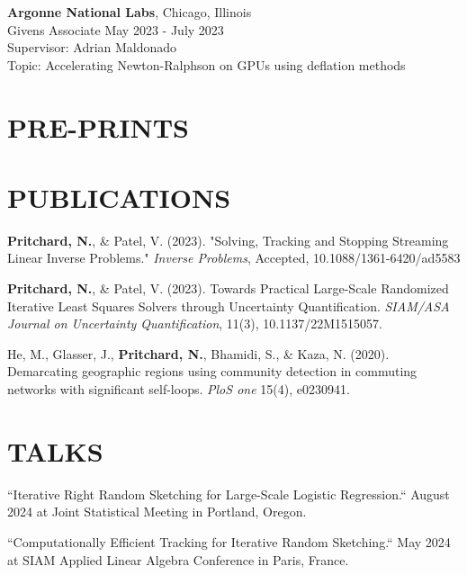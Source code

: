 \documentclass[margin,11pt]{res}
\def\nwp{\textbf{Pritchard, N.}}
\begin{document}
\begin{resume}
                {\bf Argonne National Labs}, \hfill Chicago, Illinois\\
                Givens Associate \hfill May 2023 - July 2023\\
                Supervisor: Adrian Maldonado\\
                Topic: Accelerating Newton-Ralphson on GPUs using deflation methods
\section{PRE-PRINTS}
\section{PUBLICATIONS}
\nwp, \& Patel, V. (2023). "Solving, Tracking and Stopping Streaming Linear Inverse Problems." \textit{Inverse Problems}, Accepted, 10.1088/1361-6420/ad5583


\nwp, \& Patel, V. (2023). Towards Practical Large-Scale Randomized Iterative Least Squares Solvers through Uncertainty Quantification. \textit{SIAM/ASA Journal on Uncertainty Quantification}, 11(3), 10.1137/22M1515057. 

He, M., Glasser, J., \nwp, Bhamidi, S., \& Kaza, N. (2020). Demarcating geographic regions using community detection in commuting networks with significant self-loops. \textit{PloS one} 15(4), e0230941.



\section{TALKS}

``Iterative Right Random Sketching for Large-Scale Logistic Regression.`` August 2024 at Joint Statistical Meeting in Portland, Oregon.

``Computationally Efficient Tracking for Iterative Random Sketching.`` May 2024 at SIAM Applied Linear Algebra Conference in Paris, France.


\end{resume}
\end{document}
